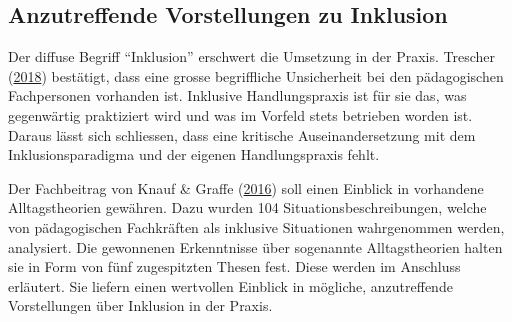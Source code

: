 \documentclass[
  ngerman,
  11pt,
  paper=a4,
  twoside,
  titlepage=true,
  openright,
  abstract=on,
  toc=listofnumbered,
  numbers=noenddot,
  chapterprefix=true,
  headings=optiontohead,
  svgnames,
  dvipsnames]{scrreprt}
\begin{document}
\hypertarget{sec:inklusionkita}{%
\subsection{Anzutreffende Vorstellungen zu
Inklusion}\label{sec:inklusionkita}}

Der diffuse Begriff “Inklusion” erschwert die Umsetzung in der Praxis.
Trescher (\protect\hyperlink{ref-eineKriseDieKeineSeinDarf}{2018})
bestätigt, dass eine grosse begriffliche Unsicherheit bei den
pädagogischen Fachpersonen vorhanden ist. Inklusive Handlungspraxis ist
für sie das, was gegenwärtig praktiziert wird und was im Vorfeld stets
betrieben worden ist. Daraus lässt sich schliessen, dass eine kritische
Auseinandersetzung mit dem Inklusionsparadigma und der eigenen
Handlungspraxis fehlt.

Der Fachbeitrag von Knauf \& Graffe
(\protect\hyperlink{ref-alltagsTheorienUeberInklusion}{2016}) soll einen
Einblick in vorhandene Alltagstheorien gewähren. Dazu wurden 104
Situationsbeschreibungen, welche von pädagogischen Fachkräften als
inklusive Situationen wahrgenommen werden, analysiert. Die gewonnenen
Erkenntnisse über sogenannte Alltagstheorien halten sie in Form von fünf
zugespitzten Thesen fest. Diese werden im Anschluss erläutert. Sie
liefern einen wertvollen Einblick in mögliche, anzutreffende
Vorstellungen über Inklusion in der Praxis.
\end{document}
